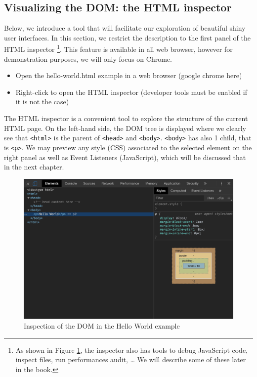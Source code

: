 \documentclass[
]{book}
\providecommand{\tightlist}{%
  \setlength{\itemsep}{0pt}\setlength{\parskip}{0pt}}
\begin{document}
\hypertarget{visualizing-the-dom-the-html-inspector}{%
\subsection{Visualizing the DOM: the HTML inspector}\label{visualizing-the-dom-the-html-inspector}}

Below, we introduce a tool that will facilitate our exploration of beautiful shiny user interfaces. In this section, we restrict the description to the first panel of the HTML inspector \footnote{As shown in Figure \ref{fig:html-dom}, the inspector also has tools to debug JavaScript code, inspect files, run performances audit, \ldots{} We will describe some of these later in the book.}. This feature is available in all web browser, however for demonstration purposes, we will only focus on Chrome.

\begin{itemize}
\tightlist
\item
  Open the hello-world.html example in a web browser (google chrome here)
\item
  Right-click to open the HTML inspector (developer tools must be enabled if it is not the case)
\end{itemize}

The HTML inspector is a convenient tool to explore the structure of the current HTML page. On the left-hand side, the DOM tree is displayed where we clearly see that \texttt{\textless{}html\textgreater{}} is the parent of \texttt{\textless{}head\textgreater{}} and \texttt{\textless{}body\textgreater{}}. \texttt{\textless{}body\textgreater{}} has also 1 child, that is \texttt{\textless{}p\textgreater{}}. We may preview any style (CSS) associated to the selected element on the right panel as well as Event Listeners (JavaScript), which will be discussed that in the next chapter.

\begin{figure}
\includegraphics[width=21.5in]{images/survival-kit/dom} \caption{Inspection of the DOM in the Hello World example}\label{fig:html-dom}
\end{figure}
\end{document}
